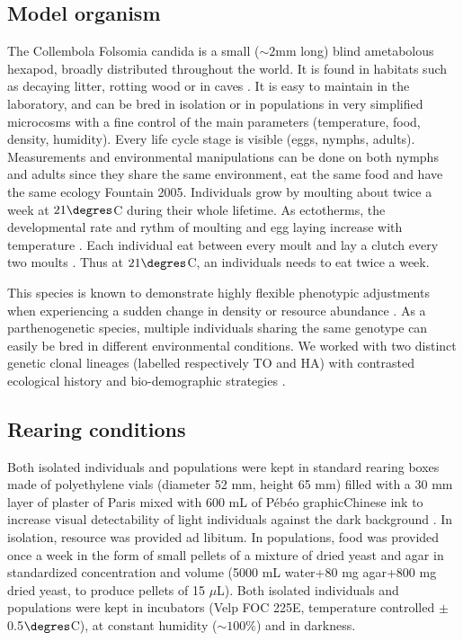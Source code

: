 \subsection{Model organism}

The Collembola Folsomia candida is a small ($\sim 2$mm long) blind ametabolous
hexapod, broadly distributed throughout the world. It is found in habitats such
as decaying litter, rotting wood or in caves \autocites{fountain2005a}. It
is easy to maintain in the laboratory, and can be bred in isolation or in populations in
very simplified microcosms with a fine control of the main parameters
(temperature, food, density, humidity). Every life cycle stage is visible (eggs,
nymphs, adults). Measurements and environmental manipulations can be done on
both nymphs and adults since they share the same environment, eat the same food
and have the same ecology {Fountain 2005}. Individuals grow by moulting about
twice a week at $21\degres$C during their whole lifetime. As ectotherms, the
developmental rate and rythm of moulting and egg laying increase with
temperature \autocites{cutkomp1986chronobiologic}. Each individual eat between every
moult and lay a clutch every two moults \autocites{palevody1974a}. Thus
at $21\degres$C, an individuals needs to eat twice a week.

This species is known to demonstrate highly flexible phenotypic adjustments when
experiencing a sudden change in density or resource abundance \autocites{tully2008a}.
As a parthenogenetic species, multiple individuals sharing the same genotype can
easily be bred in different environmental conditions. We worked with two
distinct genetic clonal lineages (labelled respectively TO and HA) with
contrasted ecological history and bio-demographic strategies
\autocites{tully2006a,tully2008a}.

\subsection{Rearing conditions}

Both isolated individuals and populations were kept in standard rearing boxes
made of polyethylene vials (diameter 52 mm, height 65 mm) filled with a 30 mm
layer of plaster of Paris mixed with 600 mL of Pébéo graphic\circledR Chinese
ink to increase visual detectability of light individuals against the dark
background \autocites{tully2008a}. In isolation, resource was provided ad
libitum. In populations, food was provided once a week in the form of small
pellets of a mixture of dried yeast and agar in standardized concentration and
volume (5000 mL water+80 mg agar+800 mg dried yeast, to produce pellets of 15
$\mu$L). Both isolated individuals and populations were kept in incubators (Velp
FOC 225E, temperature controlled $\pm$0.5$\degres$C), at constant humidity ($\sim
100\%$) and in darkness.

